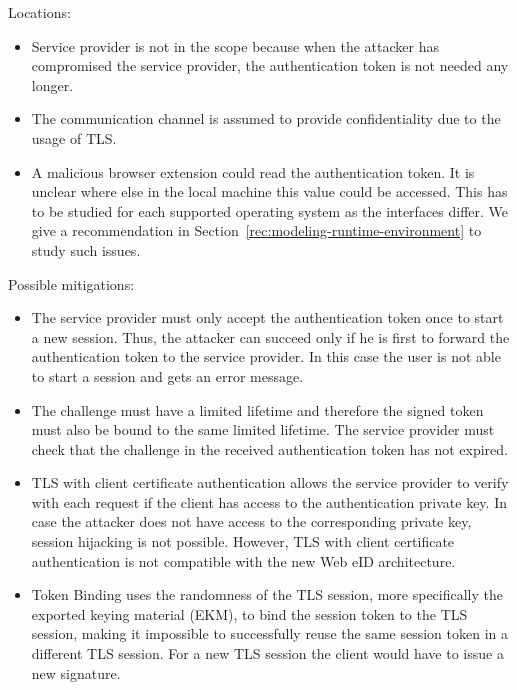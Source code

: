 Locations:
\begin{itemize}
\item Service provider is not in the scope because when the attacker has compromised the service provider, the authentication token is not needed any longer.

\item The communication channel is assumed to provide confidentiality due to the usage of TLS.

\item A malicious browser extension could read the authentication token. It is unclear where else in the local machine this value could be accessed. This has to be studied for each supported operating system as the interfaces differ. We give a recommendation in Section~\ref{rec:modeling-runtime-environment} to study such issues.
\end{itemize}

Possible mitigations:
\begin{itemize}
\item The service provider must only accept the authentication token once to start a new session. Thus, the attacker can succeed only if he is first to forward the authentication token to the service provider. In this case the user is not able to start a session and gets an error message.

\item The challenge must have a limited lifetime and therefore the signed token must also be bound to the same limited lifetime. The service provider must check that the challenge in the received authentication token has not expired.

\item TLS with client certificate authentication allows the service provider to verify with each request if the client has access to the authentication private key. In case the attacker does not have access to the corresponding private key, session hijacking is not possible. However, TLS with client certificate authentication is not compatible with the new Web eID architecture.

\item Token Binding uses the randomness of the TLS session, more specifically the exported keying material (EKM), to bind the session token to the TLS session, making it impossible to successfully reuse the same session token in a different TLS session. For a new TLS session the client would have to issue a new signature.
\end{itemize}


